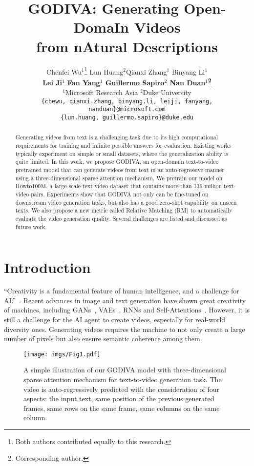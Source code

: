 \documentclass{article}
\title{GODIVA: Generating Open-DomaIn Videos\\ from nAtural Descriptions}
\author{Chenfei Wu$^{1}$\thanks{Both authors contributed equally to this research.} \quad Lun Huang$^{2}$\samethanks[1] \quad Qianxi Zhang$^{1}$ \quad Binyang Li$^{1}$ \\
\textbf{ Lei Ji$^{1}$ \quad Fan Yang$^{1}$ \quad Guillermo Sapiro$^{2}$ \quad Nan Duan$^{1}$\thanks{Corresponding author.} }\\
 {\small $^{1}$Microsoft Research Asia \quad $^{2}$Duke University} \\
{\tt\small\{chewu, qianxi.zhang, binyang.li, leiji, fanyang, nanduan\}@microsoft.com}\\
{\tt\small\{lun.huang, guillermo.sapiro\}@duke.edu}}
\begin{document}
\maketitle

\begin{abstract}
Generating videos from text is a challenging task due to its high computational requirements for training and infinite possible answers for evaluation. Existing works typically experiment on simple or small datasets, where the generalization ability is quite limited. In this work, we propose GODIVA, an open-domain text-to-video pretrained model that can generate videos from text in an auto-regressive manner using a three-dimensional sparse attention mechanism. We pretrain our model on Howto100M, a large-scale text-video dataset that contains more than 136 million text-video pairs. Experiments show that GODIVA not only can be fine-tuned on downstream video generation tasks, but also has a good zero-shot capability on unseen texts. We also propose a new metric called Relative Matching (RM) to automatically evaluate the video generation quality. Several challenges are listed and discussed as future work.
\end{abstract}




\section{Introduction}
``Creativity is a fundamental feature of human intelligence, and a challenge for AI.''~\cite{bodenCreativityArtificialIntelligence1998}. Recent advances in image and text generation have shown great creativity of machines, including GANs~\cite{brockLargeScaleGAN2019,zhangSelfattentionGenerativeAdversarial2019}, VAEs~\cite{razaviGeneratingDiverseHighfidelity2019,oordNeuralDiscreteRepresentation2017}, RNNs\cite{wenSemanticallyConditionedLstmbased2015,prakashNeuralParaphraseGeneration2016} and Self-Attentions~\cite{radfordLanguageModelsAre2019}. However, it is still a challenge for the AI agent to create videos, especially for real-world diversity ones. Generating videos requires the machine to not only create a large number of pixels but also ensure semantic coherence among them. 

\begin{figure}[h]
	\centering
	\texttt{[image: imgs/Fig1.pdf]}
	\caption{A simple illustration of our GODIVA model with three-dimensional sparse attention mechanism for text-to-video generation task. The video is auto-regressively predicted with the consideration of four aspects: the input text, same position of the previous generated frames, same rows on the same frame, same columns on the same column.}
	\label{fig:small}
\end{figure}
\end{document}
